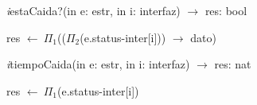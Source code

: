 \vspace{11pt}

\textit{i}estaCaida?(in e: estr, in i: interfaz) $\longrightarrow$ res: bool\\
\begin{algorithm}[H]
\BlankLine
res $\leftarrow\ \Pi_1$(($\Pi_2$(e.status-inter[i])) $\rightarrow$ dato)
\end{algorithm}

\vspace{11pt}

\textit{i}tiempoCaida(in e: estr, in i: interfaz) $\longrightarrow$ res: nat\\
\begin{algorithm}[H]
res $\leftarrow\ \Pi_1$(e.status-inter[i])
\end{algorithm}

\vspace{11pt}

